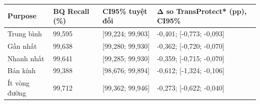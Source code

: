 \par\smallskip\noindent\begin{tabularx}{\linewidth}{@{}P{3.2cm}XXX@{}}\toprule
\textbf{Purpose} & \textbf{BQ Recall (\%)} & \textbf{CI95\% tuyệt đối} & \textbf{Δ so TransProtect* (pp), CI95\%} \\
\midrule
Trung bình & 99{,}595 & [99{,}224; 99{,}903] & -0{,}401; [-0{,}773; -0{,}093] \\
Gần nhất & 99{,}638 & [99{,}280; 99{,}930] & -0{,}362; [-0{,}720; -0{,}070] \\
Nhanh nhất & 99{,}641 & [99{,}285; 99{,}930] & -0{,}359; [-0{,}715; -0{,}070] \\
Bán kính & 99{,}388 & [98{,}676; 99{,}894] & -0{,}612; [-1{,}324; -0{,}106] \\
Ít vòng đường & 99{,}712 & [99{,}362; 99{,}946] & -0{,}273; [-0{,}622; -0{,}040] \\
\bottomrule\end{tabularx}\par\smallskip

